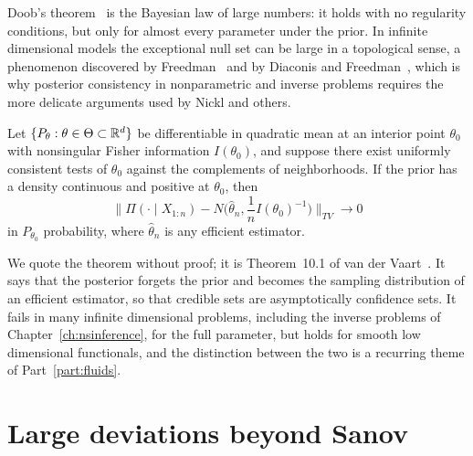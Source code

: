 Doob's theorem~\cite{doob1949} is the Bayesian law of large numbers: it holds with no regularity conditions, but only for almost every parameter under the prior. In infinite dimensional models the exceptional null set can be large in a topological sense, a phenomenon discovered by Freedman~\cite{freedman1963} and by Diaconis and Freedman~\cite{diaconisfreedman1986}, which is why posterior consistency in nonparametric and inverse problems requires the more delicate arguments used by Nickl and others.

\begin{theorem}
\label{thm:bvm}
Let $\{P_\theta:\theta\in\Theta\subset\mathbb{R}^d\}$ be differentiable in quadratic mean at an interior point $\theta_0$ with nonsingular Fisher information $I(\theta_0)$, and suppose there exist uniformly consistent tests of $\theta_0$ against the complements of neighborhoods. If the prior has a density continuous and positive at $\theta_0$, then
\[
\Big\|\Pi(\cdot\mid X_{1:n})-N\Big(\hat\theta_n,\frac{1}{n}I(\theta_0)^{-1}\Big)\Big\|_{TV}\to0
\]
in $P_{\theta_0}$ probability, where $\hat\theta_n$ is any efficient estimator.
\end{theorem}

We quote the theorem without proof; it is Theorem~10.1 of van der Vaart~\cite{vandervaart1998}. It says that the posterior forgets the prior and becomes the sampling distribution of an efficient estimator, so that credible sets are asymptotically confidence sets. It fails in many infinite dimensional problems, including the inverse problems of Chapter~\ref{ch:nsinference}, for the full parameter, but holds for smooth low dimensional functionals, and the distinction between the two is a recurring theme of Part~\ref{part:fluids}.

\section{Large deviations beyond Sanov}

